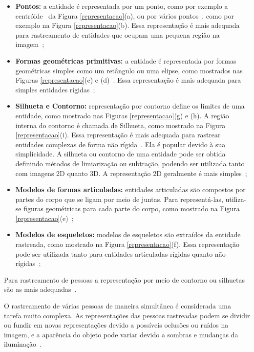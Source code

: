 	\begin{itemize}
		\item \textbf{Pontos:} a entidade é representada por um ponto, como por exemplo a centróide~\cite{veenman} da Figura \ref{representacao}(a), ou por vários pontos~\cite{serby}, como por exemplo na Figura \ref{representacao}(b). Essa representação é mais adequada para rastreamento de entidades que ocupam uma pequena região na imagem~\cite{yilmaz};

		\item \textbf{Formas geométricas primitivas:} a entidade é representada por formas geométricas simples como um retângulo ou uma elipse, como mostrados nas Figuras \ref{representacao}(c) e (d)~\cite{comaniciu}. Essa representação é mais adequada para simples entidades rígidas~\cite{yilmaz};

		\item \textbf{Silhueta e Contorno:} representação por contorno define os limites de uma entidade, como mostrado nas Figuras \ref{representacao}(g) e (h). A região interna do contorno é chamada de Silhueta, como mostrado na Figura \ref{representacao}(i). Essa representação é mais adequada para rastrear entidades complexas de forma não rígida~\cite{yilmaz, yilmaz2}. Ela é popular devido à sua simplicidade. A silhueta ou contorno de uma entidade pode ser obtida definindo métodos de limiarização ou subtração, podendo ser utilizada tanto com imagens 2D quanto 3D. A representação 2D geralmente é mais simples~\cite{moeslund};

		\item \textbf{Modelos de formas articuladas:} entidades articuladas são compostos por partes do corpo que se ligam por meio de juntas. Para representá-las, utiliza-se figuras geométricas para cada parte do corpo, como mostrado na Figura \ref{representacao}(e)~\cite{yilmaz};

		\item \textbf{Modelos de esqueletos:} modelos de esqueletos são extraídos da entidade rastreada, como mostrado na Figura \ref{representacao}(f). Essa representação pode ser utilizada tanto para entidades articuladas rígidas quanto não rígidas~\cite{yilmaz};
	\end{itemize}

	Para rastreamento de pessoas a representação por meio de contorno ou silhuetas são as mais adequadas~\cite{yilmaz}.

	O rastreamento de várias pessoas de maneira simultânea é considerada uma tarefa muito complexa. As representações das pessoas rastreadas podem se dividir ou fundir em novas representações devido a possíveis oclusões ou ruídos na imagem, e a aparência do objeto pode variar devido a sombras e mudanças da iluminação~\cite{moeslund}.


